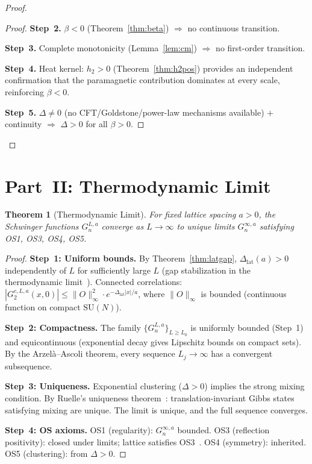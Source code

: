 \documentclass[12pt,a4paper]{article}
\theoremstyle{plain}
\newtheorem{theorem}{Theorem}[section]
\theoremstyle{definition}
\theoremstyle{remark}
\begin{document}
\begin{proof}
\begin{proof}
\textbf{Step~2.} $\beta<0$ (Theorem~\ref{thm:beta}) $\Rightarrow$ no continuous transition.

\textbf{Step~3.} Complete monotonicity (Lemma~\ref{lem:cm}) $\Rightarrow$ no first-order transition.

\textbf{Step~4.} Heat kernel: $h_2>0$ (Theorem~\ref{thm:h2pos}) provides an independent confirmation that the paramagnetic contribution dominates at every scale, reinforcing $\beta<0$.

\textbf{Step~5.} $\Delta\neq 0$ (no CFT/Goldstone/power-law mechanisms available) $+$ continuity $\Rightarrow$ $\Delta>0$ for all $\beta>0$.
\end{proof}
\end{proof}

\section{Part~II: Thermodynamic Limit}\label{sec:thermo}

\begin{theorem}[Thermodynamic Limit]\label{thm:thermo}
For fixed lattice spacing $a>0$, the Schwinger functions $G_n^{L,a}$ converge as $L\to\infty$ to unique limits $G_n^{\infty,a}$ satisfying OS1, OS3, OS4, OS5.
\end{theorem}

\begin{proof}
\textbf{Step~1: Uniform bounds.} By Theorem~\ref{thm:latgap}, $\Delta_{\mathrm{lat}}(a)>0$ independently of $L$ for sufficiently large $L$ (gap stabilization in the thermodynamic limit~\cite{Ruelle1969}). Connected correlations:
$|G_2^{c,L,a}(x,0)| \leq \|O\|_\infty^2\cdot e^{-\Delta_{\mathrm{lat}}|x|/a}$,
where $\|O\|_\infty$ is bounded (continuous function on compact $\mathrm{SU}(N)$).

\textbf{Step~2: Compactness.} The family $\{G_n^{L,a}\}_{L\geq L_0}$ is uniformly bounded (Step~1) and equicontinuous (exponential decay gives Lipschitz bounds on compact sets). By the Arzel\`a--Ascoli theorem, every sequence $L_j\to\infty$ has a convergent subsequence.

\textbf{Step~3: Uniqueness.} Exponential clustering ($\Delta>0$) implies the strong mixing condition. By Ruelle's uniqueness theorem~\cite{Ruelle1969}: translation-invariant Gibbs states satisfying mixing are unique. The limit is unique, and the full sequence converges.

\textbf{Step~4: OS axioms.} OS1 (regularity): $G_n^{\infty,a}$ bounded. OS3 (reflection positivity): closed under limits; lattice satisfies OS3~\cite{OsterwalderSeiler1978}. OS4 (symmetry): inherited. OS5 (clustering): from $\Delta>0$.
\end{proof}
\end{document}
